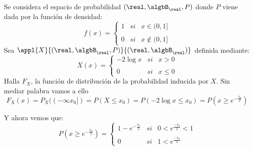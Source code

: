 \begin{problem}[8]
Se considera el espacio de probabilidad $(\real, \algbB_{\real}, P)$ donde $P$ viene dada por la función de densidad:
\[
f(x)= \left\{ \begin{array}{lcc}
             1 &   si  & x \in  (0, 1] \\
             \\ 0 &  si & x \notin (0, 1]
             \end{array}
   \right.
\]
Sea $\appl{X}{(\real, \algbB_{\real}, P)}{(\real, \algbB_{\real})}$ definida mediante:
\[
X(x)= \left\{ \begin{array}{lcc}
             -2\log x &   si  & x >  0 \\
             \\ 0 &  si & x \leq 0
             \end{array}
   \right.
\]
Halla $F_X$, la función de distribución de la probabilidad inducida por $X$.
\solution
Sin mediar palabra vamos a ello
\[F_X(x) = P_X((-\infty x_0]) = P(X \leq x_0) = P(-2\log x \leq x_0) = P(x \geq e^{-\frac{x_0}{2}})\]

Y ahora vemos que:
\[
P(x \geq e^{- \frac{x_0}{2}})= \left\{ \begin{array}{lcc}
             1-e^{-\frac{x_0}{2}} &   si  & 0 < e^{\frac{-x_0}{2}} <1 \\
             \\ 0 &  si & 1 < e^{\frac{-x_0}{2}}
             \end{array}
   \right.
\]
\end{problem}